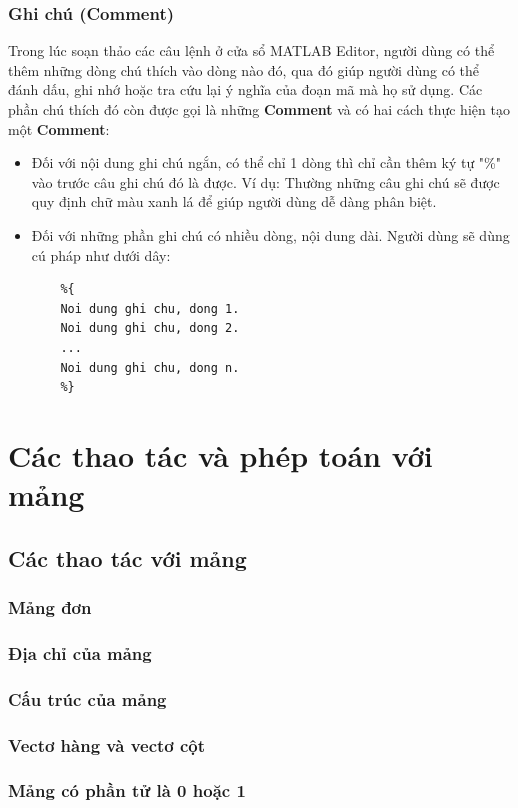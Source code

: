 \documentclass[12pt,a4paper]{article}
\begin{document}
\subsubsection{Ghi chú (Comment)}
Trong lúc soạn thảo các câu lệnh ở cửa sổ MATLAB Editor, người dùng có thể thêm những dòng chú thích vào dòng nào đó, qua đó giúp người dùng có thể đánh dấu, ghi nhớ hoặc tra cứu lại ý nghĩa của đoạn mã mà họ sử dụng. Các phần chú thích đó còn được gọi là những \textbf{Comment} và có hai cách thực hiện tạo một \textbf{Comment}:
\begin{itemize}
	\item Đối với nội dung ghi chú ngắn, có thể chỉ 1 dòng thì chỉ cần thêm ký tự "\%" vào trước câu ghi chú đó là được. Ví dụ: \textcolor{green}{} Thường những câu ghi chú sẽ được quy định chữ màu xanh lá để giúp người dùng dễ dàng phân biệt.
	\item Đối với những phần ghi chú có nhiều dòng, nội dung dài. Người dùng sẽ dùng cú pháp như dưới dây:
\begin{lstlisting}
	%{
	Noi dung ghi chu, dong 1.
	Noi dung ghi chu, dong 2.
	...
	Noi dung ghi chu, dong n.
	%}
\end{lstlisting}
\end{itemize}
\section{Các thao tác và phép toán với mảng}
\subsection{Các thao tác với mảng}
\subsubsection{Mảng đơn}
\subsubsection{Địa chỉ của mảng}
\subsubsection{Cấu trúc của mảng}
\subsubsection{Vectơ hàng và vectơ cột}
\subsubsection{Mảng có phần tử là 0 hoặc 1}
\end{document}
